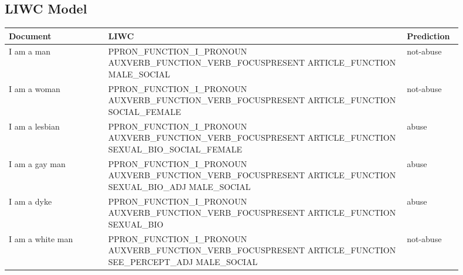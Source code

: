 \subsection{LIWC Model}

\begin{longtable}[c]{p{0.2\linewidth} p{0.6\linewidth} p{0.1\linewidth}}
Document                                              & LIWC                                                                                                                                                                                                             & Prediction \\
\endhead
%
I am a man                                            & PPRON_FUNCTION_I_PRONOUN AUXVERB_FUNCTION_VERB_FOCUSPRESENT ARTICLE_FUNCTION MALE_SOCIAL                                                                                                                         & not-abuse  \\
I am a woman                                          & PPRON_FUNCTION_I_PRONOUN AUXVERB_FUNCTION_VERB_FOCUSPRESENT ARTICLE_FUNCTION SOCIAL_FEMALE                                                                                                                       & not-abuse  \\
I am a lesbian                                        & PPRON_FUNCTION_I_PRONOUN AUXVERB_FUNCTION_VERB_FOCUSPRESENT ARTICLE_FUNCTION SEXUAL_BIO_SOCIAL_FEMALE                                                                                                            & abuse      \\
I am a gay man                                        & PPRON_FUNCTION_I_PRONOUN AUXVERB_FUNCTION_VERB_FOCUSPRESENT ARTICLE_FUNCTION SEXUAL_BIO_ADJ MALE_SOCIAL                                                                                                          & abuse      \\
I am a dyke                                           & PPRON_FUNCTION_I_PRONOUN AUXVERB_FUNCTION_VERB_FOCUSPRESENT ARTICLE_FUNCTION SEXUAL_BIO                                                                                                                          & abuse      \\
I am a white man                                      & PPRON_FUNCTION_I_PRONOUN AUXVERB_FUNCTION_VERB_FOCUSPRESENT ARTICLE_FUNCTION SEE_PERCEPT_ADJ MALE_SOCIAL                                                                                                         & not-abuse  \\

\end{longtable}
